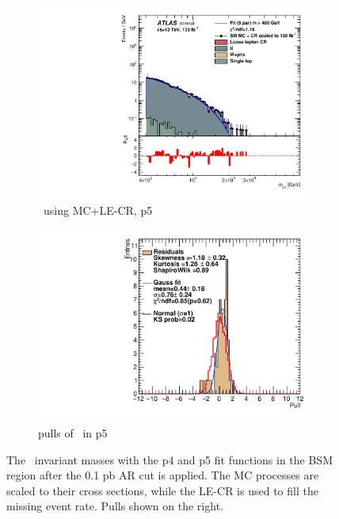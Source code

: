 \begin{figure}[ht]
\begin{subfigure}[h]{0.38\linewidth}
    \includegraphics[scale=0.3]{figs/ch6/fit/variable_nosmooth/p5/01PB/output_SMMCplusCR_Mjm_p5.pdf}%
     \caption{\mjmu \ using MC+LE-CR, p5}
     \end{subfigure}
     \hfill
    \begin{subfigure}[h]{0.4\linewidth}
    \includegraphics[scale=0.32]{figs/ch6/fit/variable_nosmooth/p5/01PB/pull_SMMCplusCR_Mjm_p5.pdf}%
    \caption{pulls of \mjmu \ in p5}
    \end{subfigure}
    \caption{The \mjmu \ invariant masses with the p4 and p5 fit functions in the BSM region after the 0.1 pb AR cut is applied. The MC processes are scaled to their cross sections, while the LE-CR is used to fill the missing event rate. Pulls shown on the right.}
\label{fig:mjm-fit-pulls-01pb}
\end{figure}

